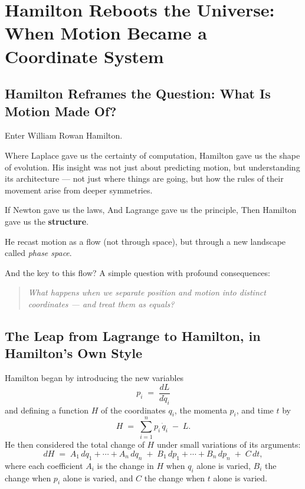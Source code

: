 \section{Hamilton Reboots the Universe: When Motion Became a Coordinate System}

\subsection{Hamilton Reframes the Question: What Is Motion Made Of?}

Enter William Rowan Hamilton.

Where Laplace gave us the certainty of computation, Hamilton gave us the shape of evolution. His insight was not just about predicting motion, but understanding its architecture — not just where things are going, but how the rules of their movement arise from deeper symmetries.

If Newton gave us the laws,  
And Lagrange gave us the principle,  
Then Hamilton gave us the \textbf{structure}.

He recast motion as a flow (not through space), but through a new landscape called \textit{phase space}. 

And the key to this flow? A simple question with profound consequences:

\begin{quote}
\textit{What happens when we separate position and motion into distinct coordinates — and treat them as equals?}
\end{quote}





\subsection{The Leap from Lagrange to Hamilton, in Hamilton’s Own Style}

Hamilton began by introducing the new variables
\[
p_i \;=\;\frac{dL}{d\dot q_i}
\]
and defining a function \(H\) of the coordinates \(q_i\), the momenta \(p_i\), and time \(t\) by
\[
H \;=\;\sum_{i=1}^n p_i\,\dot q_i \;-\; L.
\]
He then considered the total change of \(H\) under small variations of its arguments:
\[
dH
\;=\;
A_1\,dq_1 + \cdots + A_n\,dq_n
\;+\;
B_1\,dp_1 + \cdots + B_n\,dp_n
\;+\;
C\,dt,
\]
where each coefficient \(A_i\) is the change in \(H\) when \(q_i\) alone is varied, \(B_i\) the change when \(p_i\) alone is varied, and \(C\) the change when \(t\) alone is varied.

